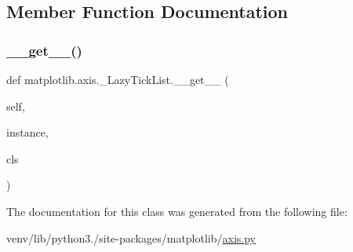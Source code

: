 \subsection{Member Function Documentation}
\mbox{\label{classmatplotlib_1_1axis_1_1__LazyTickList_a061753076744ff65e0966216bb12925f}} 
\subsubsection{\texorpdfstring{\+\_\+\+\_\+get\+\_\+\+\_\+()}{\_\_get\_\_()}}
{\footnotesize\ttfamily def matplotlib.\+axis.\+\_\+\+Lazy\+Tick\+List.\+\_\+\+\_\+get\+\_\+\+\_\+ (\begin{DoxyParamCaption}\item[{}]{self,  }\item[{}]{instance,  }\item[{}]{cls }\end{DoxyParamCaption})}



The documentation for this class was generated from the following file\+:\begin{DoxyCompactItemize}
\item 
venv/lib/python3./site-\/packages/matplotlib/\hyperlink{axis_8py}{axis.\+py}\end{DoxyCompactItemize}
